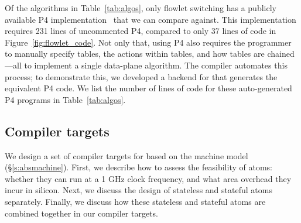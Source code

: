 Of the algorithms in Table~\ref{tab:algos}, only flowlet switching has a
publicly available P4 implementation~\cite{p4_flowlet} that we can compare
against. This implementation requires 231 lines of uncommented P4, compared to
only 37 lines of \pktlanguage code in Figure~\ref{fig:flowlet_code}. Not only
that, using P4 also requires the programmer to manually specify tables, the
actions within tables, and how tables are chained---all to implement a single
data-plane algorithm. The \pktlanguage compiler automates this process; to
demonstrate this, we developed a backend for \pktlanguage that generates the
equivalent P4 code. We list the number of lines of code for these
auto-generated P4 programs in Table~\ref{tab:algos}.
\subsection{Compiler targets}
\label{ss:targets}

We design a set of compiler targets for \pktlanguage based on the
\absmachine machine model (\S\ref{s:absmachine}). First, we describe how to
assess the feasibility of atoms: whether they can run at a 1 GHz clock
frequency, and what area overhead they incur in silicon. Next, we discuss the
design of stateless and stateful atoms separately. Finally, we discuss how
these stateless and stateful atoms are combined together in our compiler
targets.


